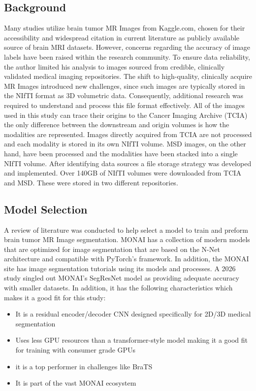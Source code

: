 \documentclass[12pt, onecolumn]{IEEEtran}
\begin{document}
\subsection{Background}
Many studies utilize brain tumor MR Images from Kaggle.com, chosen for their accessibility and widespread citation in current literature as publicly available source of brain MRI datasets. However, concerns regarding the accuracy of image labels have been raised within the research community.  To ensure data reliability, the author limited his analysis to images sourced from credible, clinically validated medical imaging repositories. The shift to high-quality, clinically acquire MR Images introduced new challenges, since such images are typically stored in the NIfTI format as 3D volumetric data.  Consequently, additional research was required to understand and process this file format effectively.  All of the images used in this study can trace their origins to the Cancer Imaging Archive (TCIA) the only difference between the downstream and origin volumes is how the modalities are represented.  Images directly acquired from TCIA are not processed and each modality is stored in its own NIfTI volume.  MSD images, on the other hand, have been processed and the modalities have been stacked into a single NIfTI volume.  After identifying data sources a file storage strategy was developed and implemented.  Over 140GB of NIfTI volumes were downloaded from TCIA and MSD.  These were stored in two different repositories.

\subsection{Model Selection}
A review of literature was conducted to help select a model to train and preform brain tumor MR Image segmentation.  MONAI has a collection of modern models that are optimized for image segmentation that are based on the N-Net architecture and compatible with PyTorch's framework.  In addition, the MONAI site has image segmentation tutorials using its models and processes.  A 2026 study singled out MONAI's SegResNet model as providing adequate accuracy with smaller datasets\cite{shen2026}.  In addition, it has the following characteristics which makes it a good fit for this study:

\begin{itemize}
	\item It is a residual encoder/decoder CNN designed specifically for 2D/3D medical segmentation
	\item Uses less GPU resources than a transformer-style model making it a good fit for training with consumer grade GPUs
	\item it is a top performer in challenges like BraTS
	\item It is part of the vast MONAI ecosystem
\end{itemize}
\end{document}
